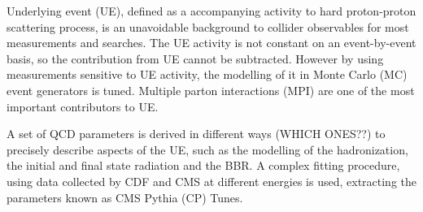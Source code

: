 \documentclass[11pt]{article}
\begin{document}
Underlying event (UE), defined as a accompanying activity to hard proton-proton scattering process,
is an unavoidable background to collider observables for most measurements and searches. The UE
activity is not constant on an event-by-event basis, so the contribution from UE cannot be subtracted.
However by using measurements sensitive to UE activity, the modelling of it in Monte Carlo (MC) event
generators is tuned. Multiple parton interactions (MPI) are one of the most important contributors to UE. \cite{hllhc_physics}

A set of QCD parameters is derived in different ways (WHICH ONES??) to precisely describe aspects of the UE, such as the modelling of the hadronization, the initial and final state radiation and the BBR.
A complex fitting procedure, using data collected by CDF and CMS at different energies is used, extracting the parameters known as CMS Pythia (CP) Tunes.
\end{document}
